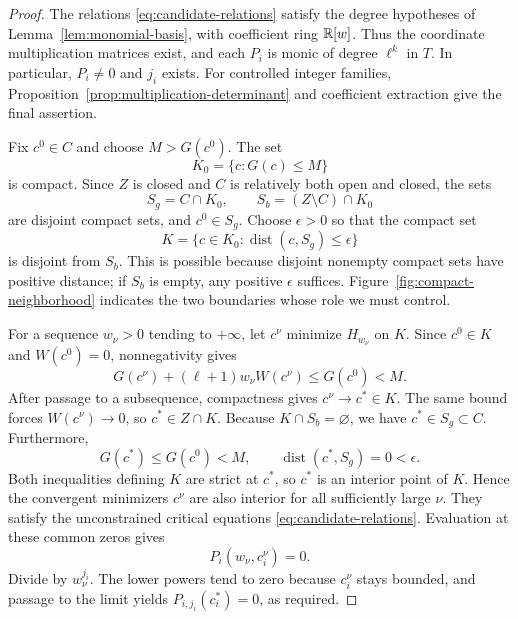 \begin{proof}
The relations \eqref{eq:candidate-relations} satisfy the degree
hypotheses of Lemma~\ref{lem:monomial-basis}, with coefficient ring
$\mathbb R[w]$.  Thus the coordinate multiplication matrices exist, and each
$P_i$ is monic of degree $\ell^k$ in $T$.  In particular, $P_i\ne0$
and $j_i$ exists.  For controlled integer families,
Proposition~\ref{prop:multiplication-determinant} and coefficient
extraction give the final assertion.

Fix $c^0\in C$ and choose $M>G(c^0)$.  The set
\[
 K_0=\{c:G(c)\le M\}
\]
is compact.  Since $Z$ is closed and $C$ is relatively both open and
closed, the sets
\[
 S_g=C\cap K_0,\qquad S_b=(Z\setminus C)\cap K_0
\]
are disjoint compact sets, and $c^0\in S_g$.  Choose $\epsilon>0$
so that the compact set
\begin{equation}\label{eq:compact-neighborhood}
 K=\{c\in K_0:\operatorname{dist}(c,S_g)\le\epsilon\}
\end{equation}
is disjoint from $S_b$.  This is possible because disjoint nonempty
compact sets have positive distance; if $S_b$ is empty, any positive
$\epsilon$ suffices.  Figure~\ref{fig:compact-neighborhood} indicates
the two boundaries whose role we must control.

For a sequence $w_\nu>0$ tending to $+\infty$, let $c^\nu$ minimize
$H_{w_\nu}$ on $K$.  Since $c^0\in K$ and $W(c^0)=0$, nonnegativity
gives
\begin{equation}\label{eq:penalty-bounds}
 G(c^\nu)+(\ell+1)w_\nu W(c^\nu)
 \le G(c^0)<M.
\end{equation}
After passage to a subsequence, compactness gives $c^\nu\to c^*\in K$.
The same bound forces $W(c^\nu)\to0$, so $c^*\in Z\cap K$.
Because $K\cap S_b=\varnothing$, we have $c^*\in S_g\subset C$.
Furthermore,
\[
 G(c^*)\le G(c^0)<M,
 \qquad \operatorname{dist}(c^*,S_g)=0<\epsilon.
\]
Both inequalities defining $K$ are strict at $c^*$, so $c^*$ is an
interior point of $K$.  Hence the convergent minimizers $c^\nu$ are
also interior for all sufficiently large $\nu$.  They satisfy the
unconstrained critical equations \eqref{eq:candidate-relations}.
Evaluation at these common zeros gives
\[
 P_i(w_\nu,c_i^\nu)=0.
\]
Divide by $w_\nu^{j_i}$.  The lower powers tend to zero because
$c_i^\nu$ stays bounded, and passage to the limit yields
$P_{i,j_i}(c_i^*)=0$, as required.
\end{proof}

